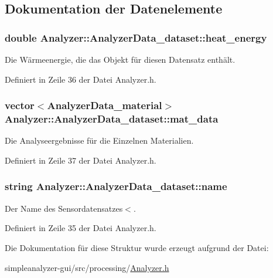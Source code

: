 \subsection{Dokumentation der Datenelemente}
\hypertarget{structAnalyzer_1_1AnalyzerData__dataset_aaefb798e2611790d5d956fe597bbafe0}{
\subsubsection[{heat\-\_\-energy}]{\setlength{\rightskip}{0pt plus 5cm}double Analyzer\-::\-Analyzer\-Data\-\_\-dataset\-::heat\-\_\-energy}}\label{structAnalyzer_1_1AnalyzerData__dataset_aaefb798e2611790d5d956fe597bbafe0}


Die Wärmeenergie, die das Objekt für diesen Datensatz enthält. 



Definiert in Zeile 36 der Datei Analyzer.\-h.

\hypertarget{structAnalyzer_1_1AnalyzerData__dataset_a25d0189c93bc0da58f778750edb2a2b9}{
\subsubsection[{mat\-\_\-data}]{\setlength{\rightskip}{0pt plus 5cm}vector$<${\bf Analyzer\-Data\-\_\-material}$>$ Analyzer\-::\-Analyzer\-Data\-\_\-dataset\-::mat\-\_\-data}}\label{structAnalyzer_1_1AnalyzerData__dataset_a25d0189c93bc0da58f778750edb2a2b9}


Die Analyseergebnisse für die Einzelnen Materialien. 



Definiert in Zeile 37 der Datei Analyzer.\-h.

\hypertarget{structAnalyzer_1_1AnalyzerData__dataset_a53f3c1896123de4dc00f01e593d5f70d}{
\subsubsection[{name}]{\setlength{\rightskip}{0pt plus 5cm}string Analyzer\-::\-Analyzer\-Data\-\_\-dataset\-::name}}\label{structAnalyzer_1_1AnalyzerData__dataset_a53f3c1896123de4dc00f01e593d5f70d}


Der Name des Sensordatensatzes$<$. 



Definiert in Zeile 35 der Datei Analyzer.\-h.



Die Dokumentation für diese Struktur wurde erzeugt aufgrund der Datei\-:\begin{DoxyCompactItemize}
\item 
simpleanalyzer-\/gui/src/processing/\hyperlink{Analyzer_8h}{Analyzer.\-h}\end{DoxyCompactItemize}
